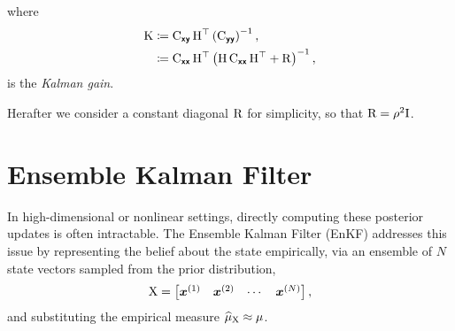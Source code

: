 \documentclass[wcp]{jmlr} %
\begin{document}
where
\begin{align}
\mathrm{K}
&\coloneq \mathrm{C}_{\boldsymbol{\mathsf{xy}}}\,\mathrm{H}^\top \left(\mathrm{C}_{\boldsymbol{\mathsf{yy}}}\right)^{-1},\label{eq:kalman-gain}\\
&\coloneq \mathrm{C}_{\boldsymbol{\mathsf{xx}}}\,\mathrm{H}^\top \left(\mathrm{H}\,\mathrm{C}_{\boldsymbol{\mathsf{xx}}}\,\mathrm{H}^\top + \mathrm{R}\right)^{-1},
\end{align}
is the \emph{Kalman gain}.

Herafter we consider a constant diagonal \(\mathrm{R}\) for simplicity, so that \(\mathrm{R}=\rho^2\mathrm{I}\).

\section{Ensemble Kalman Filter}

In high-dimensional or nonlinear settings, directly computing these posterior updates is often intractable.
The Ensemble Kalman Filter (EnKF) addresses this issue by representing the belief about the state empirically,  via an ensemble of \(N\) state vectors sampled from the prior distribution,
\begin{align}
    \mathrm{X} = \begin{bmatrix} \boldsymbol{x}^{(1)} & \boldsymbol{x}^{(2)} & \cdots & \boldsymbol{x}^{(N)} \end{bmatrix},
\end{align}
and substituting the empirical measure $\ELaw[\mm{X}]\approx \Law$.
\end{document}
